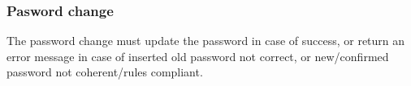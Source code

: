 \subsubsection{Pasword change} 
\small{The password change must update the password in case of success, or return an error message in case of inserted old password not correct, or new/confirmed password not coherent/rules compliant.}